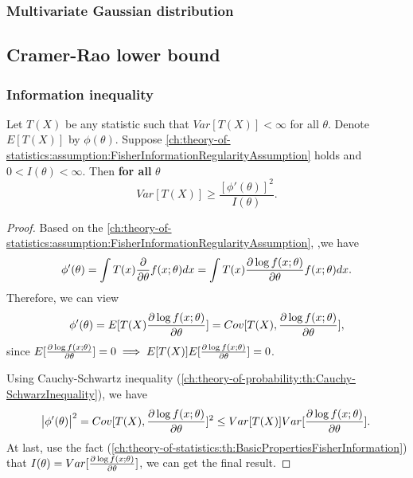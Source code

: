\begin{refsection}
\subsubsection{Multivariate Gaussian distribution}

\begin{lemma}
	
\end{lemma}


\subsection{Cramer-Rao lower bound}
\subsubsection{Information inequality}

\begin{theorem}\label{ch:theory-of-statistics:th:InformationInequalityForStatistic}
Let $T(X)$ be any statistic such that $Var[T(X)] < \infty$ for all $\theta$. Denote $E[T(X)]$ by $\phi(\theta)$. Suppose \autoref{ch:theory-of-statistics:assumption:FisherInformationRegularityAssumption} holds and $0 < I(\theta) < \infty$. Then \textbf{for all} $\theta$
$$Var[T(X)] \geq \frac{[\phi'(\theta)]^2}{I(\theta)}.$$	
\end{theorem}
\begin{proof}
Based on the \autoref{ch:theory-of-statistics:assumption:FisherInformationRegularityAssumption}, ,we have
$$\phi'(\theta) = \int T(x)\frac{\partial }{\partial \theta} f(x;\theta) dx = \int T(x)\frac{\partial \log f(x;\theta) }{\partial \theta} f(x;\theta) dx.$$
Therefore, we can view
$$\phi'(\theta) = E[T(X)\frac{\partial \log f(x;\theta) }{\partial \theta}] = Cov[T(X),\frac{\partial \log f(x;\theta) }{\partial \theta}],$$
since $E[\frac{\partial \log f(x;\theta) }{\partial \theta}] = 0 \implies E[T(X)]E[\frac{\partial \log f(x;\theta) }{\partial \theta}] = 0$.

Using Cauchy-Schwartz inequality (\autoref{ch:theory-of-probability:th:Cauchy-SchwarzInequality}), we have
$$\abs{\phi'(\theta)}^2 = Cov[T(X),\frac{\partial \log f(x;\theta) }{\partial \theta}]^2 \leq Var[T(X)]Var[\frac{\partial \log f(x;\theta) }{\partial \theta}].$$
At last, use the fact (\autoref{ch:theory-of-statistics:th:BasicPropertiesFisherInformation}) that $I(\theta) = Var[\frac{\partial \log f(x;\theta) }{\partial \theta}]$, we can get the final result. 	
\end{proof}




\end{refsection}

